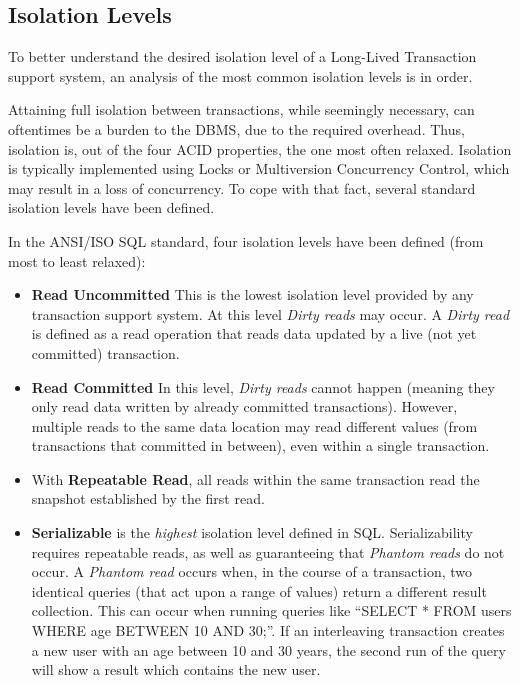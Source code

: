 \subsection{Isolation Levels}
\label{sec:isolation}

To better understand the desired isolation level of a Long-Lived
Transaction support system, an analysis of the most common isolation
levels is in order.

Attaining full isolation between transactions, while seemingly
necessary, can oftentimes be a burden to the DBMS, due to the required
overhead. Thus, isolation is, out of the four ACID properties, the one
most often relaxed. Isolation is typically implemented using Locks or
Multiversion Concurrency Control, which may result in a loss of
concurrency. To cope with that fact, several standard isolation levels
have been defined.

In the ANSI/ISO SQL standard\cite{melton1992ansi}, four isolation
levels have been defined (from most to least relaxed):

\begin{itemize}
\item {\bf Read Uncommitted} This is the lowest isolation level
  provided by any transaction support system. At this level {\it Dirty
    reads} may occur. A {\it Dirty read} is defined as a read
  operation that reads data updated by a live (not yet committed)
  transaction.
\item {\bf Read Committed} In this level, {\it Dirty reads} cannot
  happen (meaning they only read data written by already committed
  transactions). However, multiple reads to the same data location may
  read different values (from transactions that committed in between),
  even within a single transaction.
\item With {\bf Repeatable Read}, all reads within the same
  transaction read the snapshot established by the first read.
\item {\bf Serializable} is the {\it highest} isolation level defined
  in SQL. Serializability requires repeatable reads, as well as
  guaranteeing that {\it Phantom reads} do not occur. A {\it Phantom
    read} occurs when, in the course of a transaction, two identical
  queries (that act upon a range of values) return a different result
  collection. This can occur when running queries like ``SELECT * FROM
  users WHERE age BETWEEN 10 AND 30;''. If an interleaving transaction
  creates a new user with an age between 10 and 30 years, the second
  run of the query will show a result which contains the new user.
\end{itemize}

